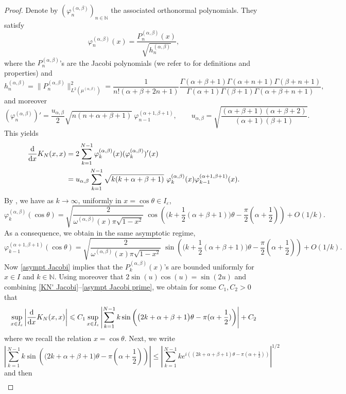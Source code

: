 \documentclass[a4paper,11pt]{article}
\numberwithin{equation}{section}
\theoremstyle{definition}
\newcommand{\eq}{\begin{equation}}
\newcommand{\qe}{\end{equation}}
\newcommand{\N}{\mathbb{N}}
\renewcommand{\leq}{\leqslant}
\renewcommand{\phi}{\varphi}
\renewcommand{\epsilon}{\varepsilon}
\renewcommand{\d}{ {\rm d}}
\begin{document}
\begin{proof}
Denote by $(\phi_n^{(\alpha,\beta)})_{n\in\N}$ the associated orthonormal polynomials. They satisfy
$$
\phi_n^{(\alpha,\beta)}(x)=\frac{P_n^{(\alpha,\beta)}(x)}{\sqrt{h_n^{(\alpha,\beta)}}},
$$
where the $P_n^{(\alpha,\beta)}$'s are the Jacobi polynomials (we refer to \citep{Sze75} for definitions and properties) and
$$
h_n^{(\alpha,\beta)}=\|P_n^{(\alpha,\beta)}\|^2_{L^2(\mu^{(\alpha,\beta)})}=\frac1{n! (\alpha+\beta+2n+1)}\frac{\Gamma(\alpha+\beta+1)\Gamma(\alpha+n+1)\Gamma(\beta+n+1)}{\Gamma(\alpha+1)\Gamma(\beta+1)\Gamma(\alpha+\beta+n+1)},
$$
and moreover
\eq
\label{jacobi derivative}
(\phi_n^{(\alpha,\beta)})'=\frac{u_{\alpha,\beta}}2\sqrt{n(n+\alpha+\beta+1)}\ \phi_{n-1}^{(\alpha+1,\beta+1)},\qquad u_{\alpha,\beta}=\sqrt{\frac{(\alpha+\beta+1)(\alpha+\beta+2)}{(\alpha+1)(\beta+1)}}.
\qe
This yields
\begin{align}
\label{KN' Jacobi}
\frac\d{\d x}K_N(x,x)& =2\sum_{k=1}^{N-1}\phi_k^{(\alpha,\beta)}(x)(\phi_k^{(\alpha,\beta)})'(x)\nonumber\\
& =u_{\alpha,\beta}\sum_{k=1}^{N-1}\sqrt{k(k+\alpha+\beta+1)}\ \phi_k^{(\alpha,\beta)}(x) \phi_{k-1}^{(\alpha+1,\beta+1)}(x).
\end{align}
By \citep{KMVV04}, we have as $k\to\infty$, uniformly in $x=\cos\theta\in I_\epsilon$,
\eq
\label{asympt Jacobi}
\phi_k^{(\alpha,\beta)}(\cos\theta)=\sqrt{\frac{2}{ \omega^{(\alpha,\beta)}(x) \pi\sqrt{1-x^2}}} \ \cos\left(\big(k+\frac12(\alpha+\beta+1)\big)\theta-\frac\pi2(\alpha +\frac12)\right)+O(1/k).
\qe
As a consequence, we obtain in the same asymptotic regime,
\eq
\label{asympt Jacobi prime}
\phi_{k-1}^{(\alpha+1,\beta+1)}(\cos\theta)=\sqrt{\frac{2}{\omega^{(\alpha,\beta)}(x) \pi\sqrt{1-x^2}}} \ \sin\left(\big(k+\frac12(\alpha+\beta+1)\big)\theta-\frac\pi2(\alpha +\frac12)\right)+O(1/k).
\qe
Now \eqref{asympt Jacobi} implies that the
$P_k^{(\alpha,\beta)}(x)$'s are bounded uniformly for $x\in I$ and $k\in\N$. Using moreover that $2\sin(u)\cos(u)=\sin(2u)$ and combining \eqref{KN' Jacobi}--\eqref{asympt Jacobi prime}, we obtain for some $C_1,C_2>0$ that
$$
\sup_{x\in I_\epsilon}\left|\frac\d{\d x}K_N(x,x)\right|\leq C_1\sup_{x\in I_\epsilon}\left|\sum_{k=1}^{N-1} k \sin\left(\big(2k+\alpha+\beta+1\big)\theta-\pi(\alpha +\frac12)\right)\right| +C_2
$$
where we recall the relation $x=\cos\theta$. Next, we write
$$
\left|\sum_{k=1}^{N-1} k \sin\left(\big(2k+\alpha+\beta+1\big)\theta-\pi(\alpha +\frac12)\right)\right|\leq \left|\sum_{k=1}^{N-1} k e^{i((2k+\alpha+\beta+1)\theta-\pi(\alpha +\frac12))}\right|^{1/2}
$$
and then
\begin{align}

\end{align}
\end{proof}
\end{document}
